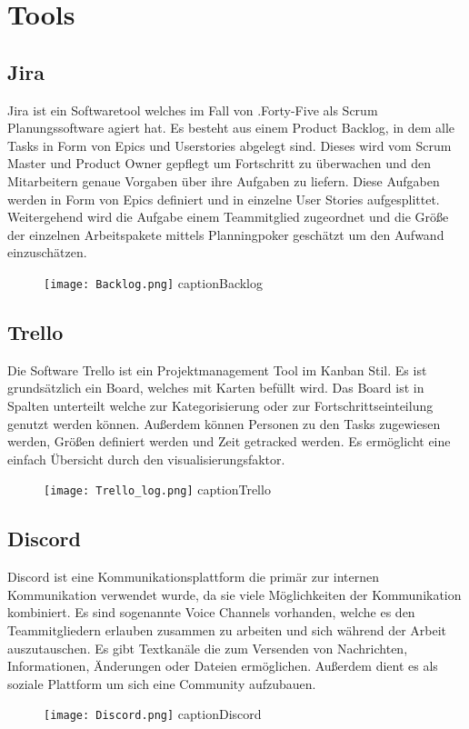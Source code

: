 
\section{Tools}\label{sec:tools}

\renewcommand{\kapitelautor}{Autor: Irgendwer} %

\subsection{Jira}\label{subsec:jira}
%
Jira ist ein Softwaretool welches im Fall von .Forty-Five als Scrum Planungssoftware agiert hat.
Es besteht aus einem Product Backlog, in dem alle Tasks in Form von Epics und Userstories abgelegt sind.
Dieses wird vom Scrum Master und Product Owner gepflegt um Fortschritt zu überwachen und den Mitarbeitern genaue Vorgaben über ihre Aufgaben zu liefern.
Diese Aufgaben werden in Form von Epics definiert und in einzelne User Stories aufgesplittet.
Weitergehend wird die Aufgabe einem Teammitglied zugeordnet und die Größe der einzelnen Arbeitspakete mittels Planningpoker geschätzt um den Aufwand einzuschätzen.

\begin{figure}[H]
\texttt{[image: Backlog.png]}
caption{Backlog}
\end{figure}

\subsection{Trello}\label{subsec:Trello}
%
Die Software Trello ist ein Projektmanagement Tool im Kanban Stil. Es ist grundsätzlich ein Board, welches mit Karten befüllt wird.
Das Board ist in Spalten unterteilt welche zur Kategorisierung oder zur Fortschrittseinteilung genutzt werden können.
Außerdem können Personen zu den Tasks zugewiesen werden, Größen definiert werden und Zeit getracked werden. Es ermöglicht eine einfach Übersicht durch den visualisierungsfaktor.
\begin{figure}[H]
    \texttt{[image: Trello\_log.png]}
    caption{Trello}
\end{figure}
%
\subsection{Discord}\label{subsec:Discord}
%
Discord ist eine Kommunikationsplattform die primär zur internen Kommunikation verwendet wurde, da sie viele Möglichkeiten der Kommunikation kombiniert.
Es sind sogenannte Voice Channels vorhanden, welche es den Teammitgliedern erlauben zusammen zu arbeiten und sich während der Arbeit auszutauschen.
Es gibt Textkanäle die zum Versenden von Nachrichten, Informationen, Änderungen oder Dateien ermöglichen. Außerdem dient es als soziale Plattform um sich eine Community aufzubauen.

\begin{figure}[H]
    \texttt{[image: Discord.png]}
    caption{Discord}
\end{figure}
%

\renewcommand{\kapitelautor}{}

